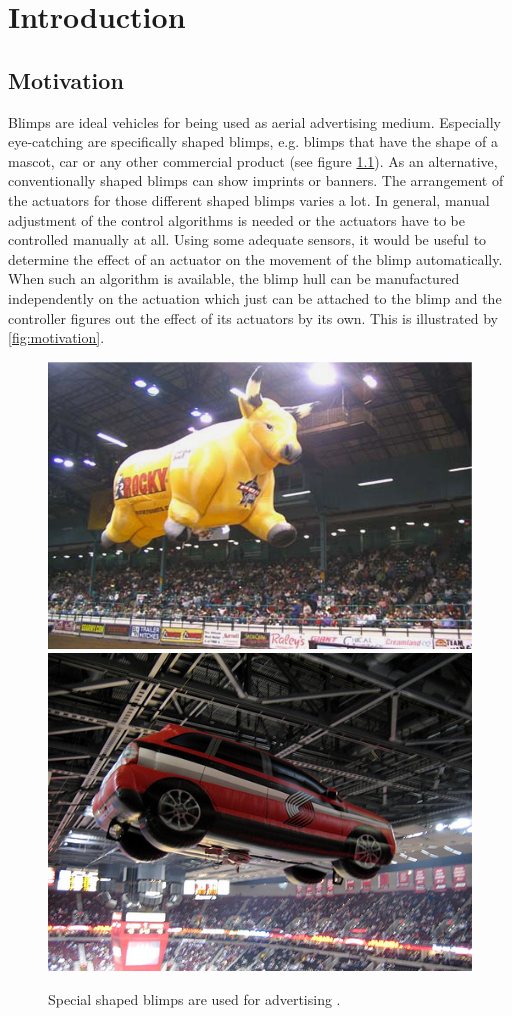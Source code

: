 \chapter{Introduction}
\label{chap:introduction}

\section{Motivation}
Blimps are ideal vehicles for being used as aerial advertising medium. Especially eye-catching are specifically shaped blimps, e.g. blimps that have the shape of a mascot, car or any other commercial product (see figure \ref{fig:blimps}).
As an alternative, conventionally shaped blimps can show imprints or banners.
The arrangement of the actuators for those different shaped blimps varies a lot.
In general, manual adjustment of the control algorithms is needed or the actuators have to be controlled manually at all.
Using some adequate sensors, it would be useful to determine the effect of an actuator on the movement of the blimp automatically.
When such an algorithm is available, the blimp hull can be manufactured independently on the actuation which just can be attached to the blimp and the controller figures out the effect of its actuators by its own.
This is illustrated by \cref{fig:motivation}.

\begin{figure}[hbtp]
\centering
\includegraphics[width=.4\linewidth]{images/CustomBull_Lg.jpg}
\includegraphics[width=.4\linewidth]{images/CustomCar.jpg}
\caption{Special shaped blimps are used for advertising \citep{rcblimps}.}
\label{fig:blimps}
\end{figure}

